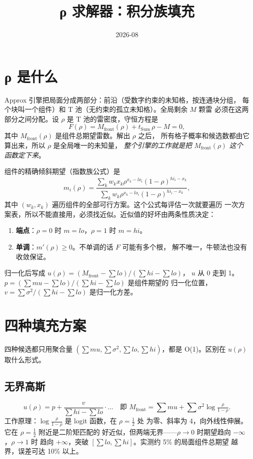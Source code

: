 \documentclass[UTF8,10pt]{ctexart}
\title{\vspace{-1.2em}ρ 求解器：积分族填充}
\author{}
\date{2026-08}
\begin{document}
\maketitle

\section{ρ 是什么}

Approx 引擎把局面分成两部分：前沿（受数字约束的未知格，按连通块分组，
每个块叫一个组件）和 T 池（无约束的孤立未知格）。全局剩余 $M$ 颗雷
必须在这两部分之间分配。设 $\rho$ 是 T 池的雷密度，守恒方程是
\begin{equation}
F(\rho) = M_{\text{front}}(\rho) + t_{\text{Sum}}\,\rho - M = 0,
\end{equation}
其中 $M_{\text{front}}(\rho)$ 是组件总期望雷数。解出 $\rho$ 之后，
所有格子概率和候选数都由它算出来，所以 $\rho$ 是全局唯一的未知量，
\emph{整个引擎的工作就是把 $M_{\text{front}}(\rho)$ 这个函数定下来}。

组件的精确倾斜期望（指数族公式）是
\begin{equation}
m_i(\rho) = \frac{\sum_k w_k x_k \rho^{x_k - lo_i}(1-\rho)^{hi_i - x_k}}
{\sum_k w_k \rho^{x_k - lo_i}(1-\rho)^{hi_i - x_k}},
\end{equation}
其中 $(w_k, x_k)$ 遍历组件的全部可行方案。这个公式每评估一次就要遍历
一次方案表，所以不能直接用，必须找近似。近似值的好坏由两条性质决定：
\begin{enumerate}
\item \textbf{端点}：$\rho=0$ 时 $m=lo$，$\rho=1$ 时 $m=hi$。
\item \textbf{单调}：$m'(\rho)\ge 0$。不单调的话 $F$ 可能有多个根，
      解不唯一，牛顿法也没有收敛保证。
\end{enumerate}
归一化后写成 $u(\rho)=(M_{\text{front}}-\sum lo)/(\sum hi-\sum lo)$，
$u$ 从 0 走到 1。$p=(\sum mu-\sum lo)/(\sum hi-\sum lo)$ 是组件期望的
归一化位置，$v=\sum\sigma^2/(\sum hi-\sum lo)$ 是归一化方差。

\section{四种填充方案}

四种候选都只用聚合量 $(\sum mu, \sum\sigma^2, \sum lo, \sum hi)$，都是
O(1)。区别在 $u(\rho)$ 取什么形式。

\subsection{无界高斯}
\begin{equation}
u(\rho) = p + \frac{v}{\sum hi - \sum lo}\cdot\ldots \quad
\text{即 } M_{\text{front}} = \sum mu + \sum\sigma^2 \log\tfrac{\rho}{1-\rho}.
\end{equation}
工作原理：$\log\tfrac{\rho}{1-\rho}$ 是 logit 函数，在 $\rho=\frac12$ 处
为零、斜率为 4，向外线性伸展。它在 $\rho=\frac12$ 附近是二阶矩匹配的
好近似，但两端无界——$\rho\to 0$ 时期望趋向 $-\infty$，$\rho\to 1$ 时
趋向 $+\infty$，突破 $[\sum lo, \sum hi]$。实测约 5\% 的局面组件总期望
越界，误差可达 10\% 以上。
\end{document}
